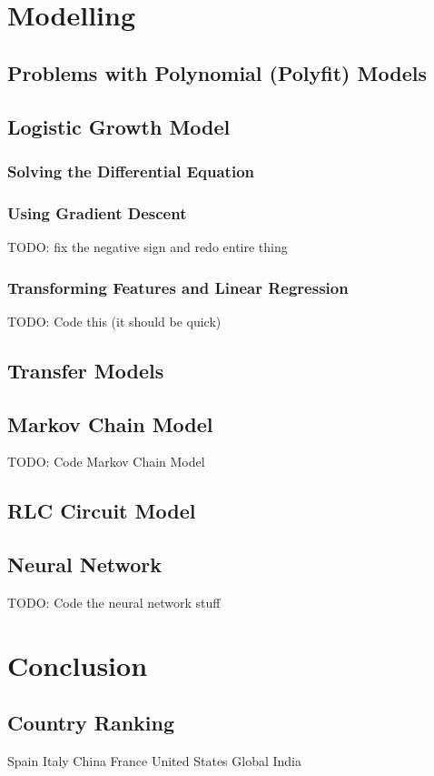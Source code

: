 \documentclass{report}
\begin{document}
    \section{Modelling}
        \subsection{Problems with Polynomial (Polyfit) Models}
        \label{sec:problems}
        \subsection{Logistic Growth Model}
            \subsubsection{Solving the Differential Equation}
            \subsubsection{Using Gradient Descent}
            TODO: fix the negative sign and redo entire thing
            \subsubsection{Transforming Features and Linear Regression}
            TODO: Code this (it should be quick)
        \subsection{Transfer Models}
        \subsection{Markov Chain Model}
            TODO: Code Markov Chain Model
        \subsection{RLC Circuit Model}
        \subsection{Neural Network}
            TODO: Code the neural network stuff
    \section{Conclusion}
        \subsection{Country Ranking}
            Spain Italy China France United States Global India
\end{document}
